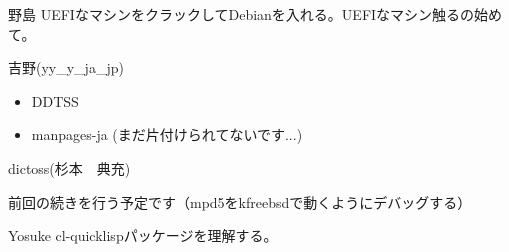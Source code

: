 \begin{prework}{ 野島 }
UEFIなマシンをクラックしてDebianを入れる。UEFIなマシン触るの始めて。
\end{prework}
\begin{prework}{ 吉野(yy\_{}y\_{}ja\_{}jp) }
\begin{itemize}
\item DDTSS
\item manpages-ja (まだ片付けられてないです...)
\end{itemize}
\end{prework}

\begin{prework}{ dictoss(杉本　典充) }

前回の続きを行う予定です（mpd5をkfreebsdで動くようにデバッグする）

\end{prework}

\begin{prework}{ Yosuke }
cl-quicklispパッケージを理解する。
\end{prework}
